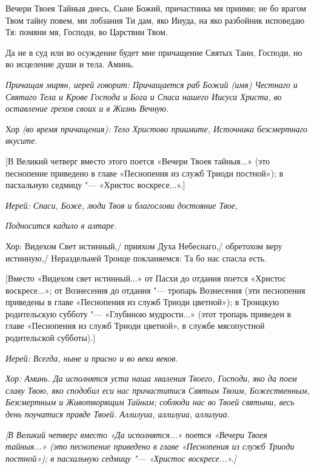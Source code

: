  Вечери Твоея Тайныя днесь, Сыне Божий, причастника мя приими; не бо врагом Твом тайну повем, ми лобзания Ти дам, яко Ииуда, на яко разбойник исповедаю Тя: помяни мя, Господи, во Царствии Твом.


  Да не в суд или во осуждение будет мне причащение Святых Таин, Господи, но во исцеление души и тела. Аминь.


\medskip 


\itshape  Причащая мирян, иерей говори\normalfont{}т: Причащается раб Божий (имя) Честнаго и Святаго Тела и Крове Господа и Бога и Спаса нашего Иисуса Христа, во оставление грехов своих и в Жизнь Вечную. 


Хор \itshape (во время причащения)\normalfont{}: Тело Христово приимите, Источника безсмертнаго вкусите.


 [В Великий четверг вместо этого поется «Вечери Твоея тайныя...» (это песнопение приведено в главе «Песнопения из служб Триоди постной»); в пасхальную седмицу "--- «Христос воскресе...».]


 \itshape Иерей:\normalfont{} Спаси, Боже, люди Твоя и благослови достояние Твое, 


\itshape Подносится кадило в алтаре.\normalfont{} 


      Хор: Видехом Свет истинный,/ прияхом Духа Небеснаго,/ обретохом веру истинную,/ Нераздельней Троице покланяемся: Та бо нас спасла есть.


      [Вместо «Видехом свет истинный...» от Пасхи до отдания поется «Христос воскресе...»; от Вознесения до отдания "--- тропарь Вознесения (эти песнопения приведены в главе «Песнопения из служб Триоди цветной»); в Троицкую родительскую субботу "--- «Глубиною мудрости...» (этот тропарь приведен в главе «Песнопения из служб Триоди цветной», в службе мясопустной родительской субботы).]


\itshape  Иерей:\normalfont{} Всегда, ныне и присно и во веки веков.


\itshape  Хор:\normalfont{} Аминь. Да исполнятся уста наша хваления Твоего, Господи, яко да поем славу Твою, яко сподобил еси нас причаститися Святым Твоим, Божественным, Безсмертным и Животворящим Тайнам; соблюди нас во Твоей святыни, весь день поучатися правде Твоей. Аллилуиа, аллилуиа, аллилуиа. 


\itshape [В Великий четверг вмест\normalfont{}о «Да исполнятся...» поется «Вечери Твоея тайныя...» (это песнопение приведено в главе «Песнопения из служб Триоди постной»); в пасхальную седмицу "--- «Христос воскресе...».]


